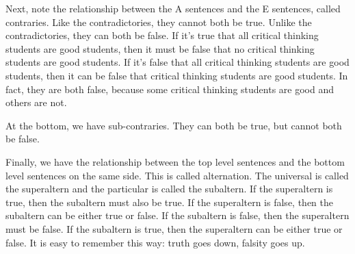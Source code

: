 \documentclass[../logic-text.tex]{subfiles}
\begin{document}
Next, note the relationship between the A sentences and the E sentences, called contraries. Like the contradictories, they cannot both be true. Unlike the contradictories, they can both be false. If it's true that all critical thinking students are good students, then it must be false that no critical thinking students are good students. If it's false that all critical thinking students are good students, then it can be false that critical thinking students are good students. In fact, they are both false, because some critical thinking students are good and others are not. 

\medskip
{}

At the bottom, we have sub-contraries. They can both be true, but cannot both be false.

\medskip
{}

Finally, we have the relationship between the top level sentences and the bottom level sentences on the same side. This is called alternation. The universal is called the superaltern and the particular is called the subaltern. If the superaltern is true, then the subaltern must also be true. If the superaltern is false, then the subaltern can be either true or false. If the subaltern is false, then the superaltern must be false. If the subaltern is true, then the superaltern can be either true or false. It is easy to remember this way: truth goes down, falsity goes up.
\end{document}
